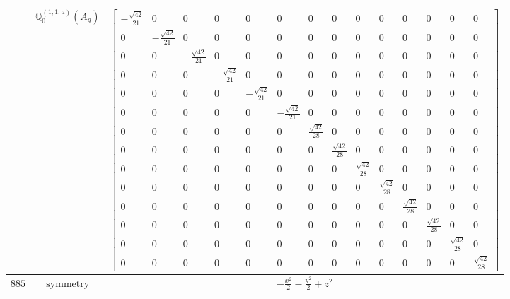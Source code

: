\documentclass[fleqn,8pt,landscape]{jsarticle}
\begin{document}
\begin{longtable}{ccc}
$  $ & $ \mathbb{Q}_{0}^{(1,1;a)}(A_{g}) $ & $ \begin{bmatrix} - \frac{\sqrt{42}}{21} & 0 & 0 & 0 & 0 & 0 & 0 & 0 & 0 & 0 & 0 & 0 & 0 & 0 \\ 0 & - \frac{\sqrt{42}}{21} & 0 & 0 & 0 & 0 & 0 & 0 & 0 & 0 & 0 & 0 & 0 & 0 \\ 0 & 0 & - \frac{\sqrt{42}}{21} & 0 & 0 & 0 & 0 & 0 & 0 & 0 & 0 & 0 & 0 & 0 \\ 0 & 0 & 0 & - \frac{\sqrt{42}}{21} & 0 & 0 & 0 & 0 & 0 & 0 & 0 & 0 & 0 & 0 \\ 0 & 0 & 0 & 0 & - \frac{\sqrt{42}}{21} & 0 & 0 & 0 & 0 & 0 & 0 & 0 & 0 & 0 \\ 0 & 0 & 0 & 0 & 0 & - \frac{\sqrt{42}}{21} & 0 & 0 & 0 & 0 & 0 & 0 & 0 & 0 \\ 0 & 0 & 0 & 0 & 0 & 0 & \frac{\sqrt{42}}{28} & 0 & 0 & 0 & 0 & 0 & 0 & 0 \\ 0 & 0 & 0 & 0 & 0 & 0 & 0 & \frac{\sqrt{42}}{28} & 0 & 0 & 0 & 0 & 0 & 0 \\ 0 & 0 & 0 & 0 & 0 & 0 & 0 & 0 & \frac{\sqrt{42}}{28} & 0 & 0 & 0 & 0 & 0 \\ 0 & 0 & 0 & 0 & 0 & 0 & 0 & 0 & 0 & \frac{\sqrt{42}}{28} & 0 & 0 & 0 & 0 \\ 0 & 0 & 0 & 0 & 0 & 0 & 0 & 0 & 0 & 0 & \frac{\sqrt{42}}{28} & 0 & 0 & 0 \\ 0 & 0 & 0 & 0 & 0 & 0 & 0 & 0 & 0 & 0 & 0 & \frac{\sqrt{42}}{28} & 0 & 0 \\ 0 & 0 & 0 & 0 & 0 & 0 & 0 & 0 & 0 & 0 & 0 & 0 & \frac{\sqrt{42}}{28} & 0 \\ 0 & 0 & 0 & 0 & 0 & 0 & 0 & 0 & 0 & 0 & 0 & 0 & 0 & \frac{\sqrt{42}}{28} \end{bmatrix} $ \\ \hline
$ 885 $ & $ \text{symmetry} $ & $ - \frac{x^{2}}{2} - \frac{y^{2}}{2} + z^{2} $ \\

\end{longtable}
\end{document}
